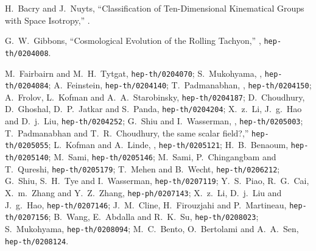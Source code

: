 \documentclass[a4paper,12pt]{article}
\begin{document}
\begin{thebibliography}{99}
 H.\ Bacry and J.\ Nuyts,
 ``Classification of Ten-Dimensional Kinematical Groups with Space
 Isotropy,'' .
 
 G.\ W.\ Gibbons,   ``Cosmological Evolution 
of the Rolling Tachyon,'' , 
{\tt hep-th/0204008}.

M.~Fairbairn and M.~H.~Tytgat, 
{\tt hep-th/0204070};
S.~Mukohyama, 
,
{\tt hep-th/0204084};
A.~Feinstein,
{\tt hep-th/0204140};
T.~Padmanabhan,
,
{\tt hep-th/0204150};
A.~Frolov, L.~Kofman and A.~A.~Starobinsky, 
{\tt hep-th/0204187};
D.~Choudhury, D.~Ghoshal, D.~P.~Jatkar and S.~Panda, 
{\tt hep-th/0204204};
X.~z.~Li, J.~g.~Hao and D.~j.~Liu, 
{\tt hep-th/0204252};
G.~Shiu and I.~Wasserman, 
, 
{\tt hep-th/0205003};
T.~Padmanabhan and T.~R.~Choudhury, 
the  same scalar field?,'' 
{\tt hep-th/0205055};
L.~Kofman and A.~Linde, 
, 
{\tt hep-th/0205121};
H.~B.~Benaoum, 
{\tt hep-th/0205140};
M.~Sami, 
{\tt hep-th/0205146};
M.~Sami, P.~Chingangbam and T.~Qureshi, 
{\tt hep-th/0205179};
T.~Mehen and B.~Wecht, 
{\tt hep-th/0206212};
G.~Shiu, S.~H.~Tye and I.~Wasserman, 
{\tt hep-th/0207119};
Y.~S.~Piao, R.~G.~Cai, X.~m.~Zhang and Y.~Z.~Zhang, 
{\tt hep-ph/0207143};
X.~z.~Li, D.~j.~Liu and J.~g.~Hao,
{\tt hep-th/0207146};
J.~M.~Cline, H.~Firouzjahi and P.~Martineau,
{\tt hep-th/0207156};
B.~Wang, E.~Abdalla and R.~K.~Su,
{\tt hep-th/0208023};
S.~Mukohyama,
{\tt hep-th/0208094};
M.~C.~Bento, O.~Bertolami and A.~A.~Sen,
{\tt hep-th/0208124}.


\end{thebibliography}
\end{document}
